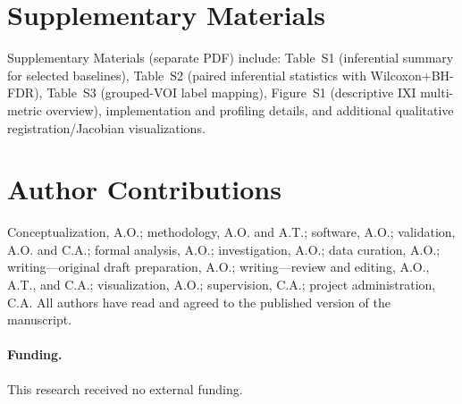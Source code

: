 \documentclass[11pt,a4paper]{article}
\begin{document}
\vspace{6pt} 

\section*{Supplementary Materials}

Supplementary Materials (separate PDF) include: Table~S1 (inferential summary for selected baselines), Table~S2 (paired inferential statistics with Wilcoxon+BH-FDR), Table~S3 (grouped-VOI label mapping), Figure~S1 (descriptive IXI multi-metric overview), implementation and profiling details, and additional qualitative registration/Jacobian visualizations.




\section*{Author Contributions}

Conceptualization, A.O.; methodology, A.O. and A.T.; software, A.O.; validation, A.O. and C.A.; formal analysis, A.O.; investigation, A.O.; data curation, A.O.; writing---original draft preparation, A.O.; writing---review and editing, A.O., A.T., and C.A.; visualization, A.O.; supervision, C.A.; project administration, C.A. All authors have read and agreed to the published version of the manuscript.

\paragraph{Funding.}
This research received no external funding.
\end{document}
